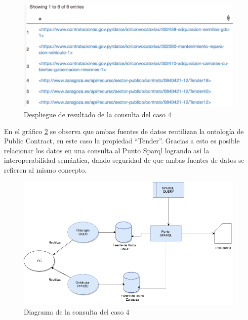 \begin{figure}[ht!]
    \centering
    \includegraphics[width=150mm]{figuras/caso4Resultado.png}
    \caption{Despliegue de resultado de la consulta del caso 4}
    \label{img:caso4Resultado}
 \end{figure}


 En el gráfico \ref{img:Diagramas-Caso 4} se observa que ambas fuentes de datos reutilizan la ontología de Public Contract, en este caso la propiedad “Tender”. Gracias a esto es posible relacionar los datos en una consulta al Punto Sparql logrando así la interoperabilidad semántica, dando seguridad de que ambas fuentes de datos se refieren al mismo concepto.

 \begin{figure}[ht!]
    \centering
    \includegraphics[width=150mm]{figuras/Diagramas-Caso4.png}
    \caption{Diagrama de la consulta del caso 4}
    \label{img:Diagramas-Caso 4}
 \end{figure}

